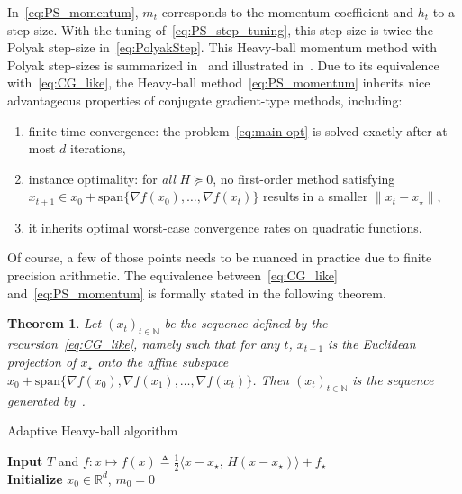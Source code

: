 \documentclass{article}
\newtheorem{Th}{Theorem}[section]
\newcommand{\Span}{\mathrm{span}}
\newcommand{\xs}{x_\star}
\begin{document}
    In~\cref{eq:PS_momentum}, $m_t$ corresponds to the momentum coefficient and $h_t$ to a step-size.
    With the tuning of~\cref{eq:PS_step_tuning}, this step-size is twice the Polyak step-size in~\cref{eq:PolyakStep}.
    This Heavy-ball momentum method with Polyak step-sizes is summarized in~ and illustrated in~.
    Due to its equivalence with~\cref{eq:CG_like}, the Heavy-ball method~\cref{eq:PS_momentum} inherits nice advantageous properties of conjugate gradient-type methods, including:
    \begin{enumerate}[label=(\roman*),topsep=0pt,noitemsep]
        \item
    finite-time convergence: the problem~\cref{eq:main-opt} is solved exactly after at most $d$ iterations,
    \item instance optimality: for \textit{all} $H\succcurlyeq 0$, no first-order method satisfying $x_{t+1}\in x_0 + \Span \{ \nabla f(x_0),  \ldots, \nabla f(x_t)\}$ results in a smaller $\|x_t-\xs\|$,
    \item it inherits optimal worst-case convergence rates on quadratic functions.
    \end{enumerate}
    Of course, a few of those points needs to be nuanced in practice due to finite precision arithmetic.
    The equivalence between~\cref{eq:CG_like} and~\cref{eq:PS_momentum} is formally stated in the following theorem.

    \begin{Th}\label{thm:main}
        Let $(x_t)_{t \in \mathbb{N}}$ be the sequence defined by the recursion~\cref{eq:CG_like}, namely such that for any $t$, $x_{t+1}$ is the Euclidean projection of $\xs$ onto the affine subspace $x_0 + \Span \{ \nabla f(x_0), \nabla f(x_1), \ldots, \nabla f(x_t)\}$.
        Then $(x_t)_{t \in \mathbb{N}}$ is the sequence generated by~.
    \end{Th}

    \begin{algorithm}[H]
        \caption{Adaptive Heavy-ball algorithm \label{alg:hb_ps}}
        \SetAlgoLined
        \textbf{Input} $T$ and $f: x \mapsto f(x) \triangleq \frac{1}{2} \langle x - \xs,\, H (x - \xs)\rangle + f_\star$\\
        \textbf{Initialize} $x_0\in\mathbb{R}^d$, $m_0=0$ \\
    \end{algorithm}
\end{document}
